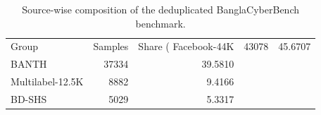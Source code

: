 \begin{table}
\caption{Source-wise composition of the deduplicated BanglaCyberBench benchmark.}
\label{tab:dataset_source_composition}
\begin{tabular}{lrr}
\toprule
Group & Samples & Share (%
\midrule
Facebook-44K & 43078 & 45.6707 \\
BANTH & 37334 & 39.5810 \\
Multilabel-12.5K & 8882 & 9.4166 \\
BD-SHS & 5029 & 5.3317 \\
\bottomrule
\end{tabular}
\end{table}
